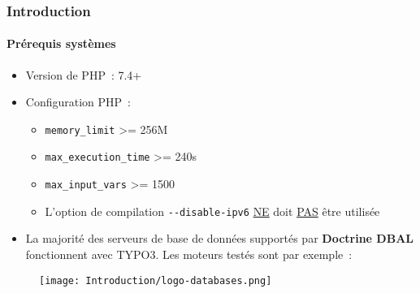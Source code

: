 %

\begin{frame}[fragile]
	\frametitle{Introduction}
	\framesubtitle{Prérequis systèmes}

	\begin{itemize}
		\item Version de PHP~: 7.4+
		\item Configuration PHP~:

			\begin{itemize}
				\item \texttt{memory\_limit} >= 256M
				\item \texttt{max\_execution\_time} >= 240s
				\item \texttt{max\_input\_vars} >= 1500
				\item L'option de compilation \texttt{-}\texttt{-disable-ipv6}
				\underline{NE} doit \underline{PAS} être utilisée
			\end{itemize}

		\item La majorité des serveurs de base de données supportés par \textbf{Doctrine DBAL}
			fonctionnent avec TYPO3. Les moteurs testés sont par exemple~:
	\end{itemize}

	\begin{figure}
		\texttt{[image: Introduction/logo-databases.png]}
	\end{figure}

\end{frame}


